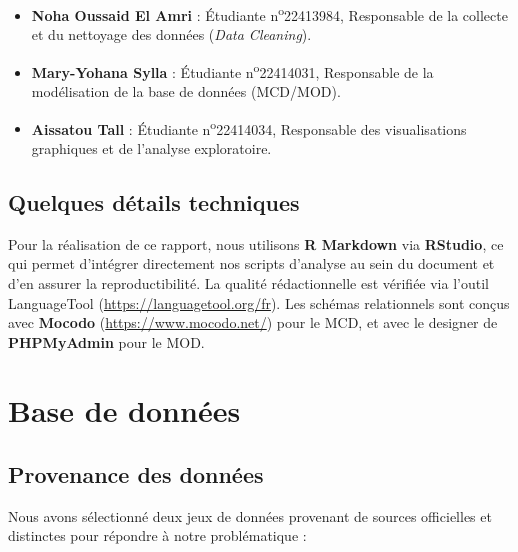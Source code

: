 \documentclass[mstat,12pt]{unswthesis}
\begin{document}
\medskip

\begin{itemize}
\tightlist
\item
  \textbf{Noha Oussaid El Amri} : Étudiante
  n\textsuperscript{o}22413984, Responsable de la collecte et du
  nettoyage des données (\textit{Data Cleaning}).
\end{itemize}

\medskip

\begin{itemize}
\tightlist
\item
  \textbf{Mary-Yohana Sylla} : Étudiante n\textsuperscript{o}22414031,
  Responsable de la modélisation de la base de données (MCD/MOD).
\end{itemize}

\medskip

\begin{itemize}
\tightlist
\item
  \textbf{Aissatou Tall} : Étudiante n\textsuperscript{o}22414034,
  Responsable des visualisations graphiques et de l'analyse
  exploratoire.
\end{itemize}

\section{Quelques détails
techniques}\label{quelques-duxe9tails-techniques}

Pour la réalisation de ce rapport, nous utilisons \textbf{R Markdown}
via \textbf{RStudio}, ce qui permet d'intégrer directement nos scripts
d'analyse au sein du document et d'en assurer la reproductibilité. La
qualité rédactionnelle est vérifiée via l'outil LanguageTool
(\url{https://languagetool.org/fr}). Les schémas relationnels sont
conçus avec \textbf{Mocodo} (\url{https://www.mocodo.net/}) pour le MCD,
et avec le designer de \textbf{PHPMyAdmin} pour le MOD.

\chapter{Base de données}\label{base-de-donnuxe9es}

\section{Provenance des données}\label{provenance-des-donnuxe9es}

Nous avons sélectionné deux jeux de données provenant de sources
officielles et distinctes pour répondre à notre problématique :
\end{document}
